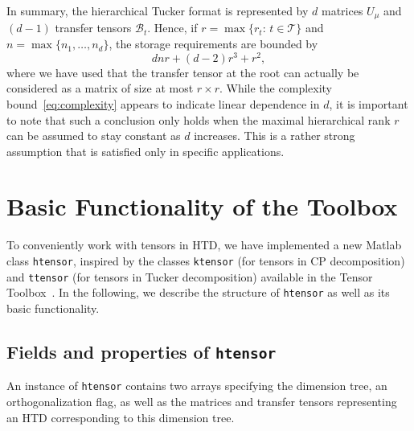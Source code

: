 \documentclass[11pt, a4paper]{article}
\newcommand{\calB}{\mathcal{B}}
\newcommand{\calT}{\mathcal{T}}
\begin{document}
In summary, the hierarchical Tucker format is represented by $d$ matrices $U_\mu$ and $(d-1)$
transfer tensors $\calB_t$. 
Hence, if $r = \max\{r_t:\,t\in \calT \}$ and $n = \max\{n_1,\ldots,n_d\}$, the storage
requirements are bounded by
\begin{equation} \label{eq:complexity}
 dnr + (d-2) r^3 + r^2,
\end{equation}
where we have used that the transfer tensor at the root can actually be considered as a matrix of size at most $r\times r$. While the complexity bound~\eqref{eq:complexity} appears to indicate linear dependence in $d$, it is important to note that such a conclusion only
holds when the maximal hierarchical rank $r$ can be assumed to stay constant as $d$ increases. This is a rather strong assumption that is satisfied only in specific applications.

\section{Basic Functionality of the Toolbox} \label{sec:basicfunctionality}

To conveniently work with tensors in HTD, we have implemented a new {\sc Matlab}
class {\tt htensor}, inspired by the classes {\tt ktensor} (for tensors in CP decomposition)
and {\tt ttensor} (for tensors in Tucker decomposition) available in the Tensor Toolbox~\cite{BadK06}. 
In the following, we describe the structure of {\tt htensor} as well as its
basic functionality.

\subsection{Fields and properties of {\tt htensor}} \label{sec:classhtensor}

An instance of {\tt htensor} contains two arrays specifying the dimension tree, an orthogonalization flag,
as well as the matrices and transfer tensors representing an HTD corresponding to
this dimension tree.
\end{document}
